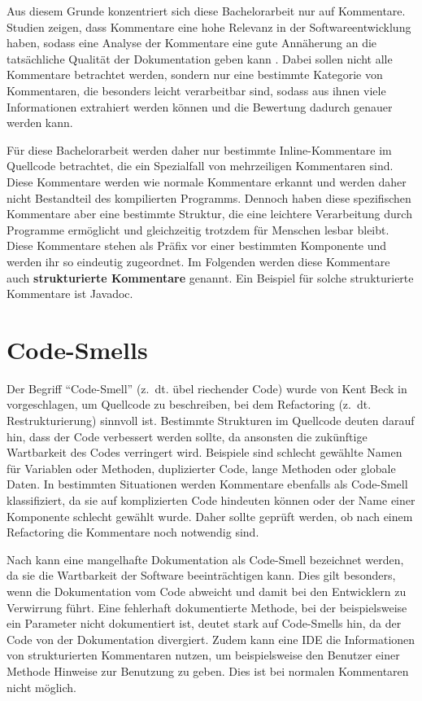 Aus diesem Grunde konzentriert sich diese Bachelorarbeit nur auf Kommentare. Studien zeigen, dass Kommentare eine hohe Relevanz in der Softwareentwicklung haben, sodass eine Analyse der Kommentare eine gute Annäherung an die tatsächliche Qualität der Dokumentation geben kann \cite[S.~71]{AStudyoftheDocumentationEssentialtoSoftwareMaintenance}. Dabei sollen nicht alle Kommentare betrachtet werden, sondern nur eine bestimmte Kategorie von Kommentaren, die besonders leicht verarbeitbar sind, sodass aus ihnen viele Informationen extrahiert werden können und die Bewertung dadurch genauer werden kann. 

Für diese Bachelorarbeit werden daher nur bestimmte Inline-Kommentare im Quellcode betrachtet, die ein Spezialfall von mehrzeiligen Kommentaren sind.
Diese Kommentare werden wie normale Kommentare erkannt und werden daher nicht Bestandteil des kompilierten Programms. Dennoch haben diese spezifischen Kommentare aber eine bestimmte Struktur, die eine leichtere Verarbeitung durch Programme ermöglicht und gleichzeitig trotzdem für Menschen lesbar bleibt. Diese Kommentare stehen als Präfix vor einer bestimmten Komponente und werden ihr so eindeutig zugeordnet. Im Folgenden werden diese Kommentare auch \textbf{strukturierte Kommentare} genannt. Ein Beispiel für solche strukturierte Kommentare ist Javadoc. 





\section{Code-Smells}\label{chapter:code_smell}
Der Begriff \enquote{Code-Smell} (z.~dt. übel riechender Code)  wurde von Kent Beck in \cite[S.~71 ff.]{fowler2019refactoring}  vorgeschlagen, um Quellcode zu beschreiben, bei dem Refactoring (z.~dt. Restrukturierung) sinnvoll ist. Bestimmte Strukturen im Quellcode deuten darauf hin, dass der Code verbessert werden sollte, da ansonsten die zukünftige Wartbarkeit des Codes verringert wird. Beispiele sind schlecht gewählte Namen für Variablen oder Methoden, duplizierter Code, lange Methoden oder globale Daten. In bestimmten Situationen werden Kommentare ebenfalls als Code-Smell klassifiziert, da sie auf komplizierten  Code hindeuten können oder der Name einer Komponente schlecht gewählt wurde. Daher sollte geprüft werden, ob nach einem Refactoring die Kommentare noch notwendig sind.

Nach \cite[S.~249-250]{JavadocViolationsandTheirEvolutioninOpen-SourceSoftware} kann eine mangelhafte Dokumentation als Code-Smell bezeichnet werden, da sie die Wartbarkeit der Software beeinträchtigen kann. Dies gilt besonders, wenn die Dokumentation vom Code abweicht und damit bei den Entwicklern zu Verwirrung führt. Eine fehlerhaft dokumentierte Methode, bei der beispielsweise ein Parameter nicht dokumentiert ist, deutet stark auf Code-Smells hin, da der Code von der Dokumentation divergiert. Zudem kann eine \ac{IDE} die Informationen von strukturierten Kommentaren nutzen, um beispielsweise den Benutzer einer Methode Hinweise zur Benutzung zu geben. Dies ist bei normalen Kommentaren nicht möglich. 

